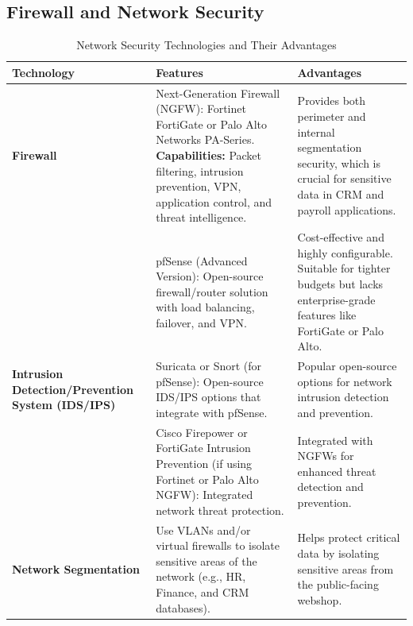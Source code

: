 \documentclass{llncs}
\begin{document}
\subsection{Firewall and Network Security}
\begin{table}[H]
  \setlength{\tabcolsep}{5pt} %
  \renewcommand{\arraystretch}{1.2} %
  \centering
  \begin{tabular}{|p{3cm}|p{7cm}|p{5cm}|}
  \hline
  \textbf{Technology} & \textbf{Features} & \textbf{Advantages} \\
  \hline
  
  \textbf{Firewall} & 
  Next-Generation Firewall (NGFW): Fortinet FortiGate or Palo Alto Networks PA-Series. \newline 
  \textbf{Capabilities:} Packet filtering, intrusion prevention, VPN, application control, and threat intelligence. & 
  Provides both perimeter and internal segmentation security, which is crucial for sensitive data in CRM and payroll applications. \\
  \hline
  
  & pfSense (Advanced Version): Open-source firewall/router solution with load balancing, failover, and VPN. & 
  Cost-effective and highly configurable. Suitable for tighter budgets but lacks enterprise-grade features like FortiGate or Palo Alto. \\
  \hline
  
  \textbf{Intrusion Detection/Prevention System (IDS/IPS)} & 
  Suricata or Snort (for pfSense): Open-source IDS/IPS options that integrate with pfSense. & 
  Popular open-source options for network intrusion detection and prevention. \\
  \hline
  
  & Cisco Firepower or FortiGate Intrusion Prevention (if using Fortinet or Palo Alto NGFW): Integrated network threat protection. & 
  Integrated with NGFWs for enhanced threat detection and prevention. \\
  \hline
  
  \textbf{Network Segmentation} & 
  Use VLANs and/or virtual firewalls to isolate sensitive areas of the network (e.g., HR, Finance, and CRM databases). & 
  Helps protect critical data by isolating sensitive areas from the public-facing webshop. \\
  \hline
  
  \end{tabular}
  \caption{Network Security Technologies and Their Advantages}
  \label{tab:network_security}
  \end{table}
  
\end{document}
